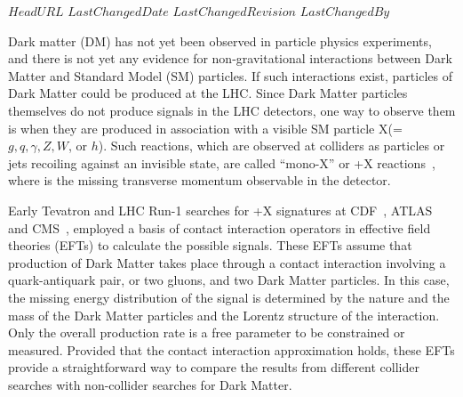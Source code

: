 \svnidlong
{$HeadURL$}
{$LastChangedDate$}
{$LastChangedRevision$}
{$LastChangedBy$}

Dark matter (DM)  has not yet been observed in particle physics experiments, and
there is not yet any evidence for non-gravitational interactions
between Dark Matter and Standard Model (SM) particles.  If such
interactions exist, particles of Dark Matter could be produced
at the LHC. Since Dark Matter particles themselves do not produce signals
in the LHC detectors, one way to observe them is when they are produced in association
with a visible SM particle X(=$g, q, \gamma, Z, W$, or $h$).
Such reactions, which are
observed at colliders as particles or jets recoiling against an invisible state, are
called ``mono-X'' or \MET{}+X reactions~\cite{Feng:2005gj,Beltran:2010ww,Bai:2010hh}, 
where \MET is the missing transverse momentum observable in the detector.



Early Tevatron and LHC Run-1 searches for \MET{}+X signatures at 
CDF~\cite{Aaltonen:2012jb}, 
ATLAS~\cite{Aad:2015zva,Aad:2014tda,ATLAS:2014wra,Aad:2014vka,Aad:2013oja,Aad:2014wza,Aad:2014vea,ATL-PHYS-PUB-2014-007}
and
CMS~\cite{Khachatryan:2014rra,Khachatryan:2014rwa,Khachatryan:2014tva,Khachatryan:2014uma,Khachatryan:2015nua,CMS-PAS-B2G-13-004,CMS-PAS-EXO-14-004},
employed a basis of contact interaction operators in effective field
theories (EFTs) \cite{Goodman:2010yf,Goodman:2010ku} to calculate the
possible signals. %
These EFTs assume that production of Dark Matter takes place through a
contact interaction involving a quark-antiquark pair, or two gluons,
and two Dark Matter particles.  In this case, the missing energy
distribution of the signal is determined by the nature and the mass of
the Dark Matter particles and the Lorentz structure of the
interaction. Only the overall production rate is a free parameter to
be constrained or measured.  Provided that the contact interaction
approximation holds, these EFTs provide a straightforward way to
compare the results from different collider searches with non-collider
searches for Dark Matter.  

